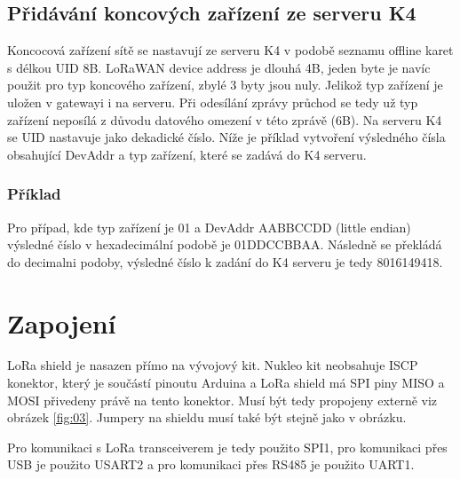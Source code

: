 \subsection{Přidávání koncových zařízení ze serveru K4}
Koncocová zařízení sítě se nastavují ze serveru K4 v podobě seznamu offline karet s délkou UID 8B.
LoRaWAN device address je dlouhá 4B, jeden byte je navíc použit pro typ koncového zařízení, zbylé 3 byty jsou nuly.
Jelikož typ zařízení je uložen v gatewayi i na serveru. Při odesílání zprávy průchod se tedy už typ zařízení neposílá z důvodu datového omezení v této zprávě (6B).
Na serveru K4 se UID nastavuje jako dekadické číslo.
Níže je příklad vytvoření výsledného čísla obsahující DevAddr a typ zařízení, které se zadává do K4 serveru.

\subsubsection{Příklad}
Pro případ, kde typ zařízení je 01 a DevAddr AABBCCDD (little endian) výsledné číslo v hexadecimální podobě je 01DDCCBBAA. Následně se překládá do decimalni podoby, výsledné číslo k zadání do K4 serveru je tedy 8016149418.


\newpage
\section{Zapojení}
LoRa shield \cite{draginoWiki} je nasazen přímo na vývojový kit. 
Nukleo kit neobsahuje ISCP konektor, který je součástí pinoutu Arduina a LoRa shield má SPI piny MISO a MOSI přivedeny právě na tento konektor. Musí být tedy propojeny externě viz obrázek \ref{fig:03}.
Jumpery na shieldu musí také být stejně jako v obrázku.



Pro komunikaci s LoRa transceiverem je tedy použito SPI1, pro komunikaci přes USB je použito USART2 a pro komunikaci přes RS485 je použito UART1.


